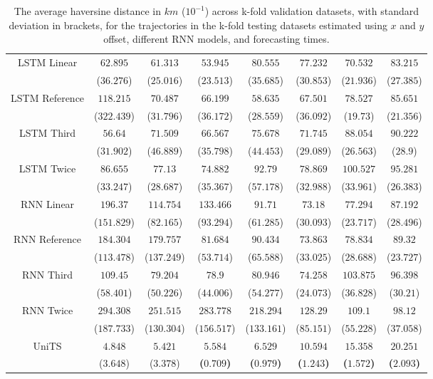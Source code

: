 \begin{table}[!ht]
{\begin{tabular}{|c|c|c|c|c|c|c|c|}
			\multirow{2}{*}{LSTM Linear} & $62.895$ & $61.313$ & $53.945$ & $80.555$ & $77.232$ & $70.532$ & $83.215$ \\
			 & ($36.276$) & ($25.016$) & ($23.513$) & ($35.685$) & ($30.853$) & ($21.936$) & ($27.385$) \\ \hline
			\multirow{2}{*}{LSTM Reference} & $118.215$ & $70.487$ & $66.199$ & $58.635$ & $67.501$ & $78.527$ & $85.651$ \\
			 & ($322.439$) & ($31.796$) & ($36.172$) & ($28.559$) & ($36.092$) & ($19.73$) & ($21.356$) \\ \hline
			\multirow{2}{*}{LSTM Third} & $56.64$ & $71.509$ & $66.567$ & $75.678$ & $71.745$ & $88.054$ & $90.222$ \\
			 & ($31.902$) & ($46.889$) & ($35.798$) & ($44.453$) & ($29.089$) & ($26.563$) & ($28.9$) \\ \hline
			\multirow{2}{*}{LSTM Twice} & $86.655$ & $77.13$ & $74.882$ & $92.79$ & $78.869$ & $100.527$ & $95.281$ \\
			 & ($33.247$) & ($28.687$) & ($35.367$) & ($57.178$) & ($32.988$) & ($33.961$) & ($26.383$) \\ \hline
			\multirow{2}{*}{RNN Linear} & $196.37$ & $114.754$ & $133.466$ & $91.71$ & $73.18$ & $77.294$ & $87.192$ \\
			 & ($151.829$) & ($82.165$) & ($93.294$) & ($61.285$) & ($30.093$) & ($23.717$) & ($28.496$) \\ \hline
			\multirow{2}{*}{RNN Reference} & $184.304$ & $179.757$ & $81.684$ & $90.434$ & $73.863$ & $78.834$ & $89.32$ \\
			 & ($113.478$) & ($137.249$) & ($53.714$) & ($65.588$) & ($33.025$) & ($28.688$) & ($23.727$) \\ \hline
			\multirow{2}{*}{RNN Third} & $109.45$ & $79.204$ & $78.9$ & $80.946$ & $74.258$ & $103.875$ & $96.398$ \\
			 & ($58.401$) & ($50.226$) & ($44.006$) & ($54.277$) & ($24.073$) & ($36.828$) & ($30.21$) \\ \hline
			\multirow{2}{*}{RNN Twice} & $294.308$ & $251.515$ & $283.778$ & $218.294$ & $128.29$ & $109.1$ & $98.12$ \\
			 & ($187.733$) & ($130.304$) & ($156.517$) & ($133.161$) & ($85.151$) & ($55.228$) & ($37.058$) \\ \hline
			\multirow{2}{*}{UniTS} & $4.848$ & $5.421$ & $\mathbf{5.584}$ & $\mathbf{6.529}$ & $\mathbf{10.594}$ & $\mathbf{15.358}$ & $\mathbf{20.251}$ \\
			 & ($3.648$) & ($3.378$) & \textbf{(}$\mathbf{0.709}$\textbf{)} & \textbf{(}$\mathbf{0.979}$\textbf{)} & \textbf{(}$\mathbf{1.243}$\textbf{)} & \textbf{(}$\mathbf{1.572}$\textbf{)} & \textbf{(}$\mathbf{2.093}$\textbf{)} \\ \hline
		\end{tabular}
	}
	\caption{The average haversine distance in $km$ ($10^{-1}$) across k-fold validation datasets, with standard deviation in brackets, for the trajectories in the k-fold testing datasets estimated using $x$ and $y$ offset, different RNN models, and forecasting times.}
	\label{tab:all_no_abs_haversine}
\end{table}

